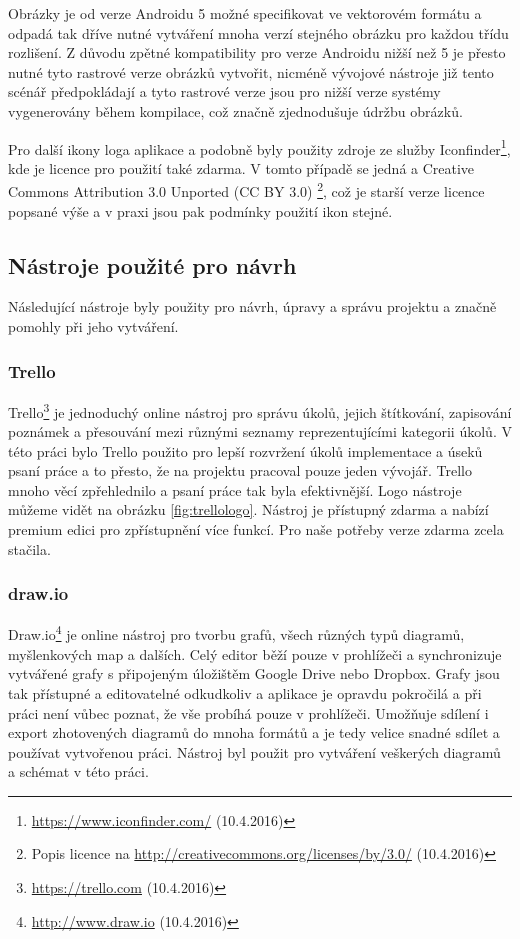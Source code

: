 \documentclass[czech,master,public,dept460,male,java,cpdeclaration]{diploma}
\begin{document}
Obrázky je od verze Androidu 5 možné specifikovat ve vektorovém formátu a odpadá tak dříve
nutné vytváření mnoha verzí stejného obrázku pro každou třídu rozlišení.
Z důvodu zpětné kompatibility pro verze Androidu nižší než 5 je přesto nutné tyto rastrové verze obrázků
vytvořit, nicméně vývojové nástroje již tento scénář předpokládají a tyto rastrové verze jsou
pro nižší verze systémy vygenerovány během kompilace, což značně zjednodušuje údržbu obrázků.



Pro další ikony loga aplikace a podobně byly použity zdroje ze služby
Iconfinder\footnote{\url{https://www.iconfinder.com/} (10.4.2016)}, kde je licence pro použití také zdarma. V tomto
případě se jedná a Creative Commons Attribution 3.0 Unported (CC BY 3.0)
\footnote{Popis licence na \url{http://creativecommons.org/licenses/by/3.0/} (10.4.2016)}, což je starší verze
licence popsané výše a v praxi jsou pak podmínky použití ikon stejné.








\subsection{Nástroje použité pro návrh}
Následující nástroje byly použity pro návrh, úpravy a správu projektu a značně pomohly při jeho vytváření.
\subsubsection{Trello}
Trello\footnote{\url{https://trello.com} (10.4.2016)} je jednoduchý online nástroj pro správu úkolů, jejich štítkování, zapisování poznámek a přesouvání
mezi různými seznamy reprezentujícími kategorii úkolů. V této práci bylo Trello použito pro lepší
rozvržení úkolů implementace a úseků psaní práce a to přesto, že na projektu pracoval pouze jeden vývojář.
Trello mnoho věcí zpřehlednilo a psaní práce tak byla efektivnější. Logo nástroje můžeme vidět
na obrázku \ref{fig:trellologo}. Nástroj je přístupný zdarma a nabízí premium edici pro zpřístupnění
více funkcí. Pro naše potřeby verze zdarma zcela stačila.

\subsubsection{draw.io}
Draw.io\footnote{\url{http://www.draw.io} (10.4.2016)} je online nástroj pro tvorbu grafů,
všech různých typů diagramů, myšlenkových map a dalších.
Celý editor běží pouze v prohlížeči a synchronizuje vytvářené grafy s připojeným úložištěm
Google Drive nebo Dropbox. Grafy jsou tak přístupné a editovatelné odkudkoliv a aplikace
je opravdu pokročilá a při práci není vůbec poznat, že vše probíhá pouze v prohlížeči.
Umožňuje sdílení i export zhotovených diagramů do mnoha formátů a je tedy velice snadné
sdílet a používat vytvořenou práci.
Nástroj byl použit pro vytváření veškerých diagramů a schémat v této práci.
\end{document}
